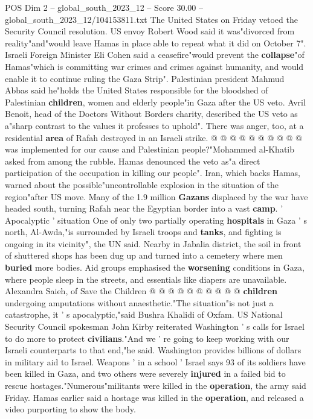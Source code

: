 \begin{textsample}{POS Dim 2 – global\_south\_2023\_12 – Score 30.00 – global\_south\_2023\_12/104153811.txt}
The United States on Friday vetoed the Security Council resolution.
US envoy Robert Wood said it was"divorced from reality"and"would leave Hamas in place able to repeat what it did on October 7".
Israeli Foreign Minister Eli Cohen said a ceasefire"would prevent the \textbf{collapse}"of Hamas"which is committing war crimes and crimes against humanity, and would enable it to continue ruling the Gaza Strip".
Palestinian president Mahmud Abbas said he"holds the United States responsible for the bloodshed of Palestinian \textbf{children}, women and elderly people"in Gaza after the US veto.
Avril Benoit, head of the Doctors Without Borders charity, described the US veto as a"sharp contrast to the values it professes to uphold".
There was anger, too, at a residential \textbf{area} of Rafah destroyed in an Israeli strike. @ @ @ @ @ @ @ @ @ @ was implemented for our cause and Palestinian people?"Mohammed al-Khatib asked from among the rubble.
Hamas denounced the veto as"a direct participation of the occupation in killing our people".
Iran, which backs Hamas, warned about the possible"uncontrollable explosion in the situation of the region"after US move.
Many of the 1.9 million \textbf{Gazans} displaced by the war have headed south, turning Rafah near the Egyptian border into a vast \textbf{camp}. ' Apocalyptic ' situation One of only two partially operating \textbf{hospitals} in Gaza ' s north, Al-Awda,"is surrounded by Israeli troops and \textbf{tanks}, and fighting is ongoing in its vicinity", the UN said.
Nearby in Jabalia district, the soil in front of shuttered shops has been dug up and turned into a cemetery where men \textbf{buried} more bodies.
Aid groups emphasised the \textbf{worsening} conditions in Gaza, where people sleep in the streets, and essentials like diapers are unavailable.
Alexandra Saieh, of Save the Children @ @ @ @ @ @ @ @ @ @ \textbf{children} undergoing amputations without anaesthetic."The situation"is not just a catastrophe, it ' s apocalyptic,"said Bushra Khalidi of Oxfam.
US National Security Council spokesman John Kirby reiterated Washington ' s calls for Israel to do more to protect \textbf{civilians}."And we ' re going to keep working with our Israeli counterparts to that end,"he said.
Washington provides billions of dollars in military aid to Israel.
Weapons ' in a school ' Israel says 93 of its soldiers have been killed in Gaza, and two others were severely \textbf{injured} in a failed bid to rescue hostages."Numerous"militants were killed in the \textbf{operation}, the army said Friday.
Hamas earlier said a hostage was killed in the \textbf{operation}, and released a video purporting to show the body.

\end{textsample}
